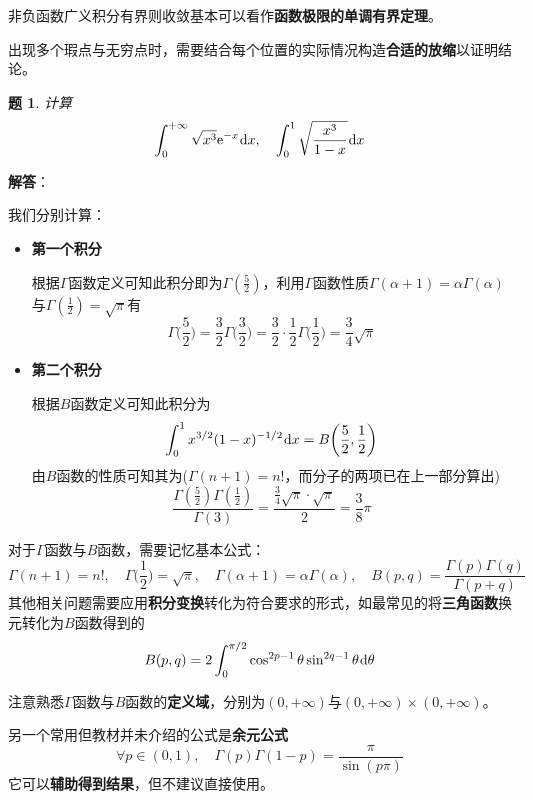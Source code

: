 \documentclass[a4paper,UTF8,fontset=windows,AutoFakeBold]{ctexart}
\newcommand*{\dr}{\hspace{0.07em}\mathrm{d}}
\newcommand*{\er}{\mathrm{e}}
\newcommand*{\note}{\noindent *}
\theoremstyle{ex}
\newtheorem{exercise}{题}
\newcommand{\sol}[1]{{\vspace{5pt}\kaishu\noindent\textbf{解答}：\vspace{-3pt}
\begin{compactitem}
    \item[] #1
\end{compactitem}
}}
\begin{document}
\note 非负函数广义积分有界则收敛基本可以看作\textbf{函数极限的单调有界定理}。

\note 出现多个瑕点与无穷点时，需要结合每个位置的实际情况构造\textbf{合适的放缩}以证明结论。

\begin{framed}
\begin{exercise}
    计算
    $$\int_0^{+\infty}\sqrt{x^3}\er^{-x}\dr x,\quad\int_0^1\sqrt{\frac{x^3}{1-x}}\dr x$$
\end{exercise}
\sol{
    我们分别计算：
    \begin{itemize}
        \item \textbf{第一个积分}
        
        根据$\Gamma$函数定义可知此积分即为$\Gamma(\frac{5}{2})$，利用$\Gamma$函数性质$\Gamma(\alpha+1)=\alpha\Gamma(\alpha)$与$\Gamma(\frac{1}{2})=\sqrt\pi$有
        $$\Gamma\bigg(\frac{5}{2}\bigg)=\frac{3}{2}\Gamma\bigg(\frac{3}{2}\bigg)=\frac{3}{2}\cdot\frac{1}{2}\Gamma\bigg(\frac{1}{2}\bigg)=\frac{3}{4}\sqrt\pi$$

        \item \textbf{第二个积分}

        根据$B$函数定义可知此积分为
        $$\int_0^1x^{3/2}(1-x)^{-1/2}\dr x=B\bigg(\frac{5}{2},\frac{1}{2}\bigg)$$
        由$B$函数的性质可知其为($\Gamma(n+1)=n!$，而分子的两项已在上一部分算出)
        $$\frac{\Gamma(\frac{5}{2})\Gamma(\frac{1}{2})}{\Gamma(3)}=\frac{\frac{3}{4}\sqrt\pi\cdot\sqrt\pi}{2}=\frac{3}{8}\pi$$
    \end{itemize}
}
\end{framed}

\note 对于$\Gamma$函数与$B$函数，需要记忆基本公式：
$$\Gamma(n+1)=n!,\quad\Gamma\bigg(\frac{1}{2}\bigg)=\sqrt{\pi},\quad\Gamma(\alpha+1)=\alpha\Gamma(\alpha),\quad B(p,q)=\frac{\Gamma(p)\Gamma(q)}{\Gamma(p+q)}$$
其他相关问题需要应用\textbf{积分变换}转化为符合要求的形式，如最常见的将\textbf{三角函数}换元转化为$B$函数得到的
$$B(p,q)=2\int_0^{\pi/2}\cos^{2p-1}\theta\sin^{2q-1}\theta\dr\theta$$

\note 注意熟悉$\Gamma$函数与$B$函数的\textbf{定义域}，分别为$(0,+\infty)$与$(0,+\infty)\times(0,+\infty)$。

\note 另一个常用但教材并未介绍的公式是\textbf{余元公式}
$$\forall p\in(0,1),\quad\Gamma(p)\Gamma(1-p)=\frac{\pi}{\sin(p\pi)}$$
它可以\textbf{辅助得到结果}，但不建议直接使用。
\end{document}
